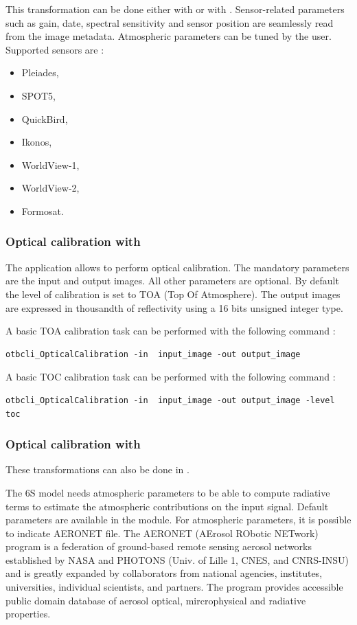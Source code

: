 This transformation can be done either with \app or with
\mont. Sensor-related parameters such as gain, date, spectral
sensitivity and sensor position are seamlessly read from the image
metadata. Atmospheric parameters can be tuned by the user. Supported
sensors are :
\begin{itemize}
\item Pleiades,
\item SPOT5,
\item QuickBird,
\item Ikonos,
\item WorldView-1,
\item WorldView-2,
\item Formosat.
\end{itemize}

\subsubsection{Optical calibration with \app}

The  application
allows to perform optical calibration. The mandatory
parameters are the input and output images. All other parameters are
optional. By default the level of calibration is set to TOA (Top Of
Atmosphere).  The output images are expressed in thousandth of
reflectivity using a 16 bits unsigned integer type.

A basic TOA calibration task can be performed with the following command :

\begin{verbatim}
otbcli_OpticalCalibration -in  input_image -out output_image
\end{verbatim}

A basic TOC calibration task can be performed with the following command :

\begin{verbatim}
otbcli_OpticalCalibration -in  input_image -out output_image -level toc
\end{verbatim}

\subsubsection{Optical calibration with \mont}

These transformations can also be done in \mont.

The 6S model needs atmospheric parameters to be able to compute
radiative terms to estimate the atmospheric contributions on the input
signal. Default parameters are available in the module.  For
atmospheric parameters, it is possible to indicate AERONET file. The
AERONET (AErosol RObotic NETwork) program is a federation of
ground-based remote sensing aerosol networks established by NASA and
PHOTONS (Univ. of Lille 1, CNES, and CNRS-INSU) and is greatly
expanded by collaborators from national agencies, institutes,
universities, individual scientists, and partners. The program
provides accessible public domain database of aerosol optical,
mircrophysical and radiative properties.

